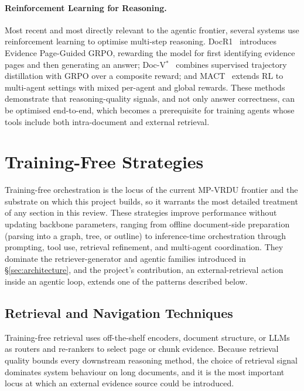 \documentclass[11pt]{article}
\begin{document}
\paragraph{Reinforcement Learning for Reasoning.}
Most recent and most directly relevant to the agentic frontier, several systems use reinforcement learning to optimise multi-step reasoning. DocR1~\cite{xiong2026docr1} introduces Evidence Page-Guided GRPO, rewarding the model for first identifying evidence pages and then generating an answer; Doc-V$^{*}$~\cite{zheng2026docvstar} combines supervised trajectory distillation with GRPO over a composite reward; and MACT~\cite{yu2025mact} extends RL to multi-agent settings with mixed per-agent and global rewards. These methods demonstrate that reasoning-quality signals, and not only answer correctness, can be optimised end-to-end, which becomes a prerequisite for training agents whose tools include both intra-document and external retrieval.

\section{Training-Free Strategies}
\label{sec:trainingfree}

Training-free orchestration is the locus of the current MP-VRDU frontier and the substrate on which this project builds, so it warrants the most detailed treatment of any section in this review. These strategies improve performance without updating backbone parameters, ranging from offline document-side preparation (parsing into a graph, tree, or outline) to inference-time orchestration through prompting, tool use, retrieval refinement, and multi-agent coordination. They dominate the retriever-generator and agentic families introduced in \S\ref{sec:architecture}, and the project's contribution, an external-retrieval action inside an agentic loop, extends one of the patterns described below.

\subsection{Retrieval and Navigation Techniques}
Training-free retrieval uses off-the-shelf encoders, document structure, or LLMs as routers and re-rankers to select page or chunk evidence. Because retrieval quality bounds every downstream reasoning method, the choice of retrieval signal dominates system behaviour on long documents, and it is the most important locus at which an external evidence source could be introduced.
\end{document}
